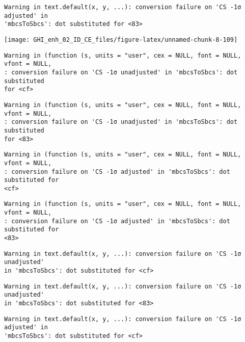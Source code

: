 \documentclass[
  10pt,
  a4paper,oneside]{article}
\begin{document}
\begin{verbatim}
Warning in text.default(x, y, ...): conversion failure on 'CS -1σ adjusted' in
'mbcsToSbcs': dot substituted for <83>
\end{verbatim}

\begin{center}\texttt{[image: GHI\_enh\_02\_ID\_CE\_files/figure-latex/unnamed-chunk-8-109]} \end{center}

\begin{verbatim}
Warning in (function (s, units = "user", cex = NULL, font = NULL, vfont = NULL,
: conversion failure on 'CS -1σ unadjusted' in 'mbcsToSbcs': dot substituted
for <cf>
\end{verbatim}

\begin{verbatim}
Warning in (function (s, units = "user", cex = NULL, font = NULL, vfont = NULL,
: conversion failure on 'CS -1σ unadjusted' in 'mbcsToSbcs': dot substituted
for <83>
\end{verbatim}

\begin{verbatim}
Warning in (function (s, units = "user", cex = NULL, font = NULL, vfont = NULL,
: conversion failure on 'CS -1σ adjusted' in 'mbcsToSbcs': dot substituted for
<cf>
\end{verbatim}

\begin{verbatim}
Warning in (function (s, units = "user", cex = NULL, font = NULL, vfont = NULL,
: conversion failure on 'CS -1σ adjusted' in 'mbcsToSbcs': dot substituted for
<83>
\end{verbatim}

\begin{verbatim}
Warning in text.default(x, y, ...): conversion failure on 'CS -1σ unadjusted'
in 'mbcsToSbcs': dot substituted for <cf>
\end{verbatim}

\begin{verbatim}
Warning in text.default(x, y, ...): conversion failure on 'CS -1σ unadjusted'
in 'mbcsToSbcs': dot substituted for <83>
\end{verbatim}

\begin{verbatim}
Warning in text.default(x, y, ...): conversion failure on 'CS -1σ adjusted' in
'mbcsToSbcs': dot substituted for <cf>
\end{verbatim}
\end{document}

